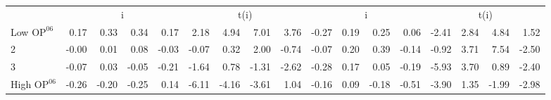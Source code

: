 \begin{table}[!ht]
\begin{tabular}{lrrrrrrrrrrrrrrrr}
  
     & \multicolumn{4}{c}{i} & \multicolumn{4}{c}{t(i)}  & \multicolumn{4}{c}{i} & \multicolumn{4}{c}{t(i)}   \\
     \cmidrule(r){2-5} \cmidrule(r){6-9}  \cmidrule(r){10-13} \cmidrule(r){14-17} 
    Low $\text{OP}^{06}$  & 0.17  & 0.33  & 0.34  & 0.17  & 2.18  & 4.94  & 7.01  & 3.76  & -0.27  & 0.19  & 0.25  & 0.06  & -2.41  & 2.84  & 4.84  & 1.52   \\
    2  & -0.00  & 0.01  & 0.08  & -0.03  & -0.07  & 0.32  & 2.00  & -0.74  & -0.07  & 0.20  & 0.39  & -0.14  & -0.92  & 3.71  & 7.54  & -2.50   \\
    3  & -0.07  & 0.03  & -0.05  & -0.21  & -1.64  & 0.78  & -1.31  & -2.62  & -0.28  & 0.17  & 0.05  & -0.19  & -5.93  & 3.70  & 0.89  & -2.40   \\
    High $\text{OP}^{06}$  & -0.26  & -0.20  & -0.25  & 0.14  & -6.11  & -4.16  & -3.61  & 1.04  & -0.16  & 0.09  & -0.18  & -0.51  & -3.90  & 1.35  & -1.99  & -2.98   \\
    
  
  \bottomrule
\end{tabular}
\label{tbl:32_Size_BM_OP_F16}
\end{table}